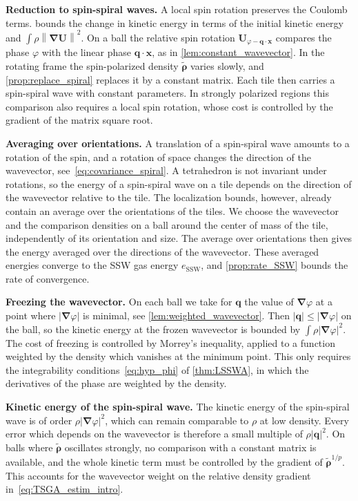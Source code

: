 \documentclass[final,reqno]{amsart}
\theoremstyle{remark}
\renewcommand{\le}{\leqslant}
\newcommand{\wt}[1]{\widetilde{#1}}
\newcommand{\SSW}{\mathrm{SSW}}
\newcommand{\norm}[1]{\left\| #1 \right\|}
\newcommand{\grad}{\bm{\nabla}}
\begin{document}
\medskip

\noindent\textbf{Reduction to spin-spiral waves.} A local spin rotation preserves the Coulomb terms.  bounds the change in kinetic energy in terms of the initial kinetic energy and $\int\rho\norm{\grad\mathbf{U}}^2$. On a ball the relative spin rotation $\mathbf{U}_{\varphi-\mathbf{q}\cdot\mathbf{x}}$ compares the phase $\varphi$ with the linear phase $\mathbf{q}\cdot\mathbf{x}$, as in \cref{lem:constant_wavevector}. In the rotating frame the spin-polarized density $\wt{\bm{\rho}}$ varies slowly, and \cref{prop:replace_spiral} replaces it by a constant matrix. Each tile then carries a spin-spiral wave with constant parameters. In strongly polarized regions this comparison also requires a local spin rotation, whose cost is controlled by the gradient of the matrix square root.

\medskip

\noindent\textbf{Averaging over orientations.} A translation of a spin-spiral wave amounts to a rotation of the spin, and a rotation of space changes the direction of the wavevector, see~\cref{eq:covariance_spiral}. A tetrahedron is not invariant under rotations, so the energy of a spin-spiral wave on a tile depends on the direction of the wavevector relative to the tile. The localization bounds, however, already contain an average over the orientations of the tiles. We choose the wavevector and the comparison densities on a ball around the center of mass of the tile, independently of its orientation and size. The average over orientations then gives the energy averaged over the directions of the wavevector. These averaged energies converge to the SSW gas energy $e_\SSW$, and \cref{prop:rate_SSW} bounds the rate of convergence.

\medskip

\noindent\textbf{Freezing the wavevector.} On each ball we take for $\mathbf{q}$ the value of $\grad\varphi$ at a point where $|\grad\varphi|$ is minimal, see \cref{lem:weighted_wavevector}. Then $|\mathbf{q}|\le|\grad\varphi|$ on the ball, so the kinetic energy at the frozen wavevector is bounded by $\int\rho|\grad\varphi|^2$. The cost of freezing is controlled by Morrey's inequality, applied to a function weighted by the density which vanishes at the minimum point. This only requires the integrability conditions~\cref{eq:hyp_phi} of \cref{thm:LSSWA}, in which the derivatives of the phase are weighted by the density.

\medskip

\noindent\textbf{Kinetic energy of the spin-spiral wave.} The kinetic energy of the spin-spiral wave is of order $\rho|\grad\varphi|^2$, which can remain comparable to $\rho$ at low density. Every error which depends on the wavevector is therefore a small multiple of $\rho|\mathbf{q}|^2$. On balls where $\wt{\bm{\rho}}$ oscillates strongly, no comparison with a constant matrix is available, and the whole kinetic term must be controlled by the gradient of $\wt{\bm{\rho}}^{1/p}$. This accounts for the wavevector weight on the relative density gradient in~\cref{eq:TSGA_estim_intro}.
\end{document}
